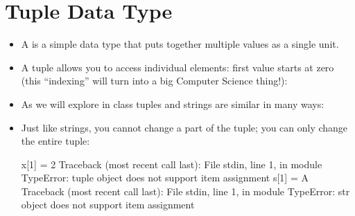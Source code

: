 \documentclass[letterpaper,10pt,english]{sphinxmanual}
\begin{document}
\section{Tuple Data Type}
\label{\detokenize{lecture_notes/lec07_modules_images:tuple-data-type}}\begin{itemize}
\item {} 
A  is a simple data type that puts together multiple values
as a single unit.

\item {} 
A tuple allows you to access individual elements:
first value starts at zero (this “indexing” will turn into a big
Computer Science thing!):

\begin{sphinxVerbatim}[commandchars=\\\{\}]
       
\PYG{p}{[}\PYG{p}{]}
\PYG{p}{[}\PYG{p}{]}
\end{sphinxVerbatim}

\item {} 
As we will explore in class tuples and strings are similar in many
ways:

\begin{sphinxVerbatim}[commandchars=\\\{\}]
  
\PYG{p}{[}\PYG{p}{]}
\PYG{p}{[}\PYG{p}{]}
\end{sphinxVerbatim}

\item {} 
Just like strings, you cannot change a part of the tuple; you can
only change the entire tuple:

\begin{sphinxVerbatim}[commandchars=\\\{\}]
\PYGZgt{}\PYGZgt{}\PYGZgt{} x[1] = 2
Traceback (most recent call last):
File \PYGZdq{}\PYGZlt{}stdin\PYGZgt{}\PYGZdq{}, line 1, in \PYGZlt{}module\PYGZgt{}
TypeError: \PYGZsq{}tuple\PYGZsq{} object does not support item assignment
\PYGZgt{}\PYGZgt{}\PYGZgt{} s[1] = \PYGZsq{}A\PYGZsq{}
Traceback (most recent call last):
File \PYGZdq{}\PYGZlt{}stdin\PYGZgt{}\PYGZdq{}, line 1, in \PYGZlt{}module\PYGZgt{}
TypeError: \PYGZsq{}str\PYGZsq{} object does not support item assignment
\end{sphinxVerbatim}

\end{itemize}
\end{document}
